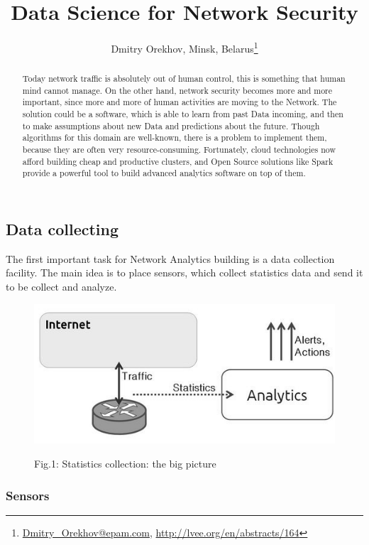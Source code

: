 \documentclass[10pt, a5paper]{article}
\begin{document}
\title{Data Science for Network Security}
\author{Dmitry Orekhov, Minsk, Belarus\footnote{\url{Dmitry_Orekhov@epam.com}, \url{http://lvee.org/en/abstracts/164}}}
\maketitle
\begin{abstract}
Today network traffic is absolutely out of human control, this is something that human mind cannot manage. On the other hand, network security becomes more and more important, since more and more of human activities are moving to the Network.
The solution could be a software, which is able to learn from past Data incoming, and then to make assumptions about new Data and predictions about the future. Though algorithms for this domain are well-known, there is a problem to implement them, because they are often very resource-consuming. Fortunately, cloud technologies now afford building cheap and productive clusters, and Open Source solutions like Spark provide a powerful tool to build advanced analytics software on top of them.
\end{abstract}
\subsection*{Data collecting}

The first important task for Network Analytics building is a data collection facility. The main idea is to place sensors, which collect statistics data and send it to be collect and analyze.

\begin{figure}[h!]
  \centering 
  \includegraphics[scale=0.5]{16_2015_fig1}
  
  Fig.1: Statistics collection: the big picture
\end{figure}

\subsubsection*{Sensors}
\end{document}
